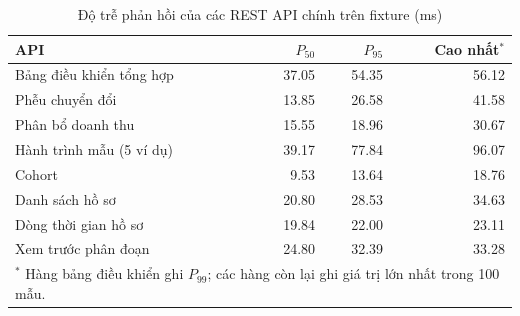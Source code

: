 \begin{table}[H]
\centering
\caption{Độ trễ phản hồi của các REST API chính trên fixture (ms)}
\label{tab:api-latency}
\small
\renewcommand{\arraystretch}{1.15}
\begin{tabular}{lrrr}
\toprule
\textbf{API} & $P_{50}$ & $P_{95}$ & \textbf{Cao nhất}$^{*}$ \\
\midrule
Bảng điều khiển tổng hợp & \num{37.05} & \num{54.35} & \num{56.12} \\
Phễu chuyển đổi & \num{13.85} & \num{26.58} & \num{41.58} \\
Phân bổ doanh thu & \num{15.55} & \num{18.96} & \num{30.67} \\
Hành trình mẫu (5 ví dụ) & \num{39.17} & \num{77.84} & \num{96.07} \\
Cohort & \num{9.53} & \num{13.64} & \num{18.76} \\
Danh sách hồ sơ & \num{20.80} & \num{28.53} & \num{34.63} \\
Dòng thời gian hồ sơ & \num{19.84} & \num{22.00} & \num{23.11} \\
Xem trước phân đoạn & \num{24.80} & \num{32.39} & \num{33.28} \\
\bottomrule
\multicolumn{4}{l}{\footnotesize $^{*}$ Hàng bảng điều khiển ghi $P_{99}$; các hàng còn lại ghi giá trị lớn nhất trong 100 mẫu.} \\
\end{tabular}
\end{table}
